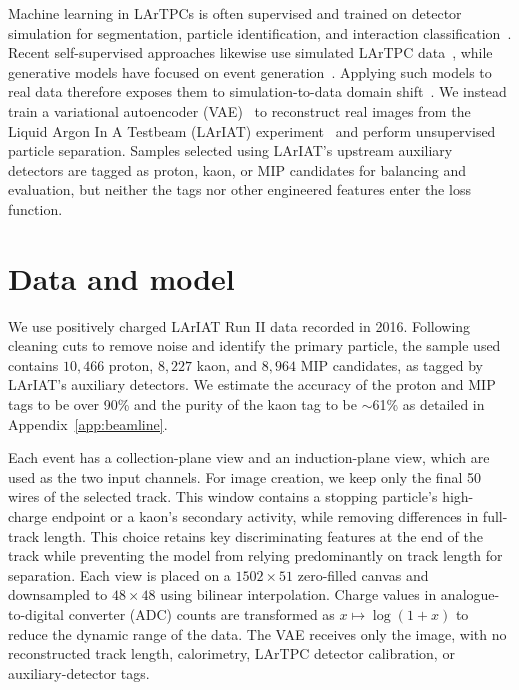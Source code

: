 \documentclass{article}
\begin{document}
Machine learning in LArTPCs is often supervised and trained on detector simulation for segmentation, particle identification, and interaction classification~\cite{Radovic2018,Acciarri2017CNN,Abratenko2021,Acciarri2018Pandora}. Recent self-supervised approaches likewise use simulated LArTPC data~\cite{young2026polarmae,wilkinson2025contrastive,alonsomonsalve2026foundation}, while generative models have focused on event generation~\cite{lutkus2022generative,imani2023diffusion}. Applying such models to real data therefore exposes them to simulation-to-data domain shift~\cite{Huang2024DomainShift}. We instead train a variational autoencoder (VAE)~\cite{Kingma2014,Higgins2017} to reconstruct real images from the Liquid Argon In A Testbeam (LArIAT) experiment~\cite{Acciarri2020LArIAT} and perform unsupervised particle separation. Samples selected using LArIAT's upstream auxiliary detectors are tagged as proton, kaon, or MIP candidates for balancing and evaluation, but neither the tags nor other engineered features enter the loss function.

\section{Data and model}
\label{sec:method}

We use positively charged LArIAT Run II data recorded in 2016. Following cleaning cuts to remove noise and identify the primary particle, the sample used contains $10{,}466$ proton, $8{,}227$ kaon, and $8{,}964$ MIP candidates, as tagged by LArIAT's auxiliary detectors. We estimate the accuracy of the proton and MIP tags to be over 90\% and the purity of the kaon tag to be $\sim$61\% as detailed in Appendix~\ref{app:beamline}.

Each event has a collection-plane view and an induction-plane view, which are used as the two input channels. For image creation, we keep only the final 50 wires of the selected track. This window contains a stopping particle's high-charge endpoint or a kaon's secondary activity, while removing differences in full-track length. This choice retains key discriminating features at the end of the track while preventing the model from relying predominantly on track length for separation. Each view is placed on a $1502\times51$ zero-filled canvas and downsampled to $48\times48$ using bilinear interpolation. Charge values in analogue-to-digital converter (ADC) counts are transformed as $x\mapsto\log(1+x)$ to reduce the dynamic range of the data. The VAE receives only the image, with no reconstructed track length, calorimetry, LArTPC detector calibration, or auxiliary-detector tags.
\end{document}
